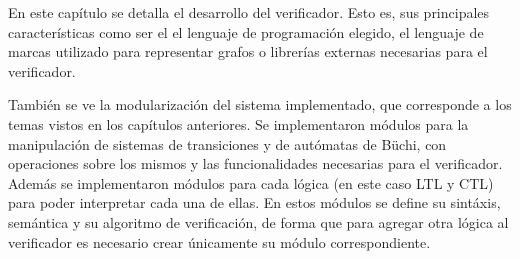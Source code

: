 En este capítulo se detalla el desarrollo del verificador.
Esto es, sus principales características como ser el el lenguaje de programación
 elegido, el lenguaje de marcas utilizado para representar grafos o librerías
 externas necesarias para el verificador.

También se ve la modularización del sistema implementado, que corresponde a los
 temas vistos en los capítulos anteriores.
Se implementaron módulos para la manipulación de sistemas de transiciones y de autómatas de Büchi,
 con operaciones sobre los mismos y las funcionalidades necesarias para el verificador.
Además se implementaron módulos para cada lógica (en este caso LTL y CTL) para poder interpretar
 cada una de ellas. En estos módulos se define su sintáxis, semántica y su algoritmo de verificación,
 de forma que para agregar otra lógica al verificador es necesario crear únicamente su módulo
 correspondiente.
